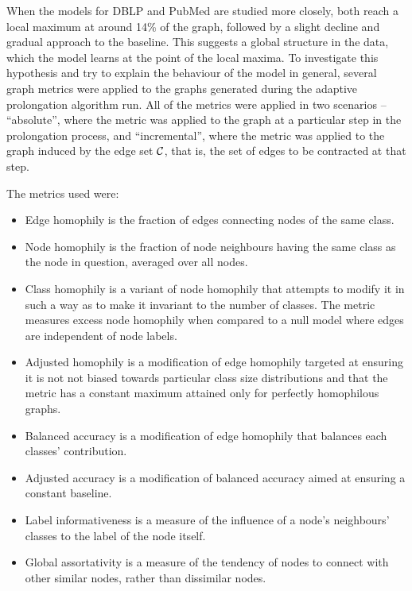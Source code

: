 \documentclass[sn-mathphys,pdflatex,iicol]{sn-jnl}%
\newcommand{\mathspace}{\ensuremath{\mathcal}}
\begin{document}
When the models for DBLP and PubMed are studied more closely, both reach a local maximum at around 14\% of the graph, followed by a slight decline and gradual approach to the baseline. This suggests a global structure in the data, which the model learns at the point of the local maxima. To investigate this hypothesis and try to explain the behaviour of the model in general, several graph metrics were applied to the graphs generated during the adaptive prolongation algorithm run. All of the metrics were applied in two scenarios -- \enquote{absolute}, where the metric was applied to the graph at a particular step in the prolongation process, and \enquote{incremental}, where the metric was applied to the graph induced by the edge set \( \mathspace{C} \), that is, the set of edges to be contracted at that step.

The metrics used were:
\begin{itemize}
  \item Edge homophily \cite{zhu_beyond_2020} is the fraction of edges connecting nodes of the same class.
  \item Node homophily \cite{pei_geom-gcn_2020} is the fraction of node neighbours having the same class as the node in question, averaged over all nodes.
  \item Class homophily \cite{lim_large_2021} is a variant of node homophily that attempts to modify it in such a way as to make it invariant to the number of classes. The metric measures excess node homophily when compared to a null model where edges are independent of node labels.
  \item Adjusted homophily \cite{platonov_characterizing_2022} is a modification of edge homophily targeted at ensuring it is not not biased towards particular class size distributions and that the metric has a constant maximum attained only for perfectly homophilous graphs.
  \item Balanced accuracy \cite{platonov_characterizing_2022} is a modification of edge homophily that balances each classes' contribution.
  \item Adjusted accuracy \cite{platonov_characterizing_2022} is a modification of balanced accuracy aimed at ensuring a constant baseline.
  \item Label informativeness \cite{platonov_characterizing_2022} is a measure of the influence of a node's neighbours' classes to the label of the node itself.
  \item Global assortativity \cite{newman_mixing_2003} is a measure of the tendency of nodes to connect with other similar nodes, rather than dissimilar nodes.
\end{itemize}
\end{document}
